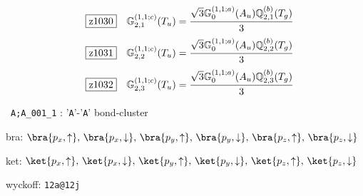 \documentclass[fleqn,10pt,landscape]{jsarticle}
\begin{document}
\begin{dmath*}
\hspace*{3mm}\fbox{z1030}\quad \mathbb{G}_{2,1}^{(1,1;c)}(T_{u})=\frac{\sqrt{3} \mathbb{G}_{0}^{(1,1;a)}(A_{u}) \mathbb{Q}_{2,1}^{(b)}(T_{g})}{3}
\end{dmath*}
\begin{dmath*}
\hspace*{3mm}\fbox{z1031}\quad \mathbb{G}_{2,2}^{(1,1;c)}(T_{u})=\frac{\sqrt{3} \mathbb{G}_{0}^{(1,1;a)}(A_{u}) \mathbb{Q}_{2,2}^{(b)}(T_{g})}{3}
\end{dmath*}
\begin{dmath*}
\hspace*{3mm}\fbox{z1032}\quad \mathbb{G}_{2,3}^{(1,1;c)}(T_{u})=\frac{\sqrt{3} \mathbb{G}_{0}^{(1,1;a)}(A_{u}) \mathbb{Q}_{2,3}^{(b)}(T_{g})}{3}
\end{dmath*}
\vspace{5mm}

\noindent\textbullet\, \texttt{A;A_001_1} : '\texttt{A}'-'\texttt{A}' bond-cluster

\noindent\quad * bra: $\bra{p_{x},\uparrow},\, \bra{p_{x},\downarrow},\, \bra{p_{y},\uparrow},\, \bra{p_{y},\downarrow},\, \bra{p_{z},\uparrow},\, \bra{p_{z},\downarrow}$

\noindent\quad * ket: $\ket{p_{x},\uparrow},\, \ket{p_{x},\downarrow},\, \ket{p_{y},\uparrow},\, \ket{p_{y},\downarrow},\, \ket{p_{z},\uparrow},\, \ket{p_{z},\downarrow}$

\noindent\quad * wyckoff: \texttt{12a@12j}
\end{document}

